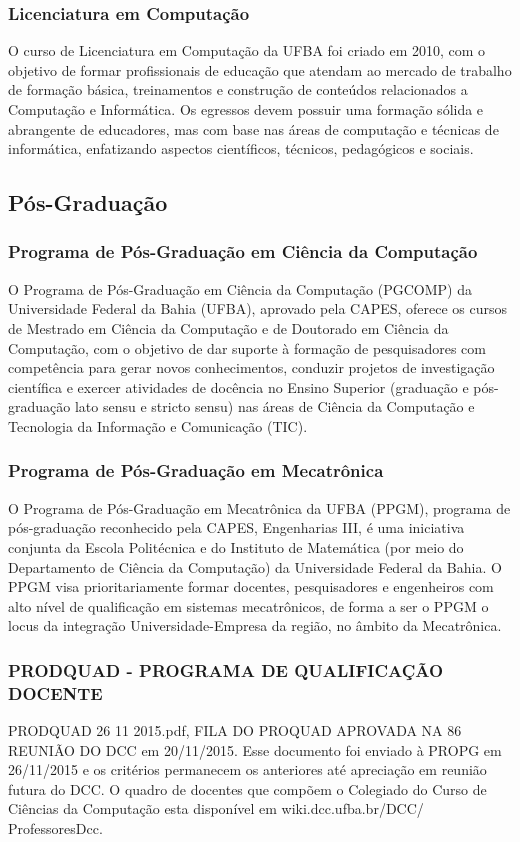     \subsubsection*{Licenciatura em Computação}
   O curso de Licenciatura em Computação da UFBA foi criado em 2010, com o objetivo de formar profissionais de educação que atendam ao mercado de trabalho de formação básica, treinamentos e construção de conteúdos relacionados a Computação e Informática. Os egressos devem possuir uma formação sólida e abrangente de educadores, mas com base nas áreas de computação e técnicas de informática, enfatizando aspectos científicos, técnicos, pedagógicos e sociais. 
   
   
    \subsection{Pós-Graduação}
   
    \subsubsection*{Programa de Pós-Graduação em Ciência da Computação}   
    O Programa de Pós-Graduação em Ciência da Computação (PGCOMP) da Universidade Federal da Bahia (UFBA), aprovado pela CAPES, oferece os cursos de Mestrado em Ciência da Computação e de Doutorado em Ciência da Computação, com o objetivo de dar suporte à formação de pesquisadores com competência para gerar novos conhecimentos, conduzir projetos de investigação científica e exercer atividades de docência no Ensino Superior (graduação e pós-graduação lato sensu e stricto sensu) nas áreas de Ciência da Computação e Tecnologia da Informação e Comunicação (TIC).
   
    \subsubsection*{Programa de Pós-Graduação em Mecatrônica}  
    O Programa de Pós-Graduação em Mecatrônica da UFBA (PPGM), programa de pós-graduação reconhecido pela CAPES, Engenharias III, é uma iniciativa conjunta da Escola Politécnica e do Instituto de Matemática (por meio do Departamento de Ciência da Computação) da Universidade Federal da Bahia. O PPGM visa prioritariamente formar docentes, pesquisadores e engenheiros com alto nível de qualificação em sistemas mecatrônicos, de forma a ser o PPGM o locus da integração Universidade-Empresa da região, no âmbito da Mecatrônica.
    
    \subsubsection*{PRODQUAD - PROGRAMA DE QUALIFICAÇÃO DOCENTE}  
    PRODQUAD 26 11 2015.pdf, FILA DO PROQUAD APROVADA NA 86 REUNIÃO DO DCC em 20/11/2015. Esse documento foi enviado à PROPG em 26/11/2015 e os critérios permanecem os anteriores até apreciação em reunião futura do DCC.
    O quadro de docentes que compõem o  Colegiado do Curso de Ciências da Computação esta disponível em wiki.dcc.ufba.br/DCC/
    ProfessoresDcc.
    
